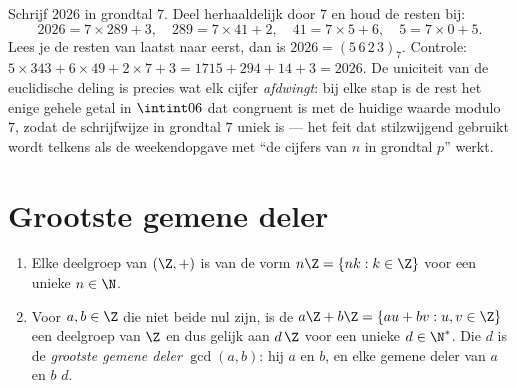 \begin{example}\label{ex:b1:arith:base7}
Schrijf $2026$ in grondtal $7$. Deel herhaaldelijk door $7$ en houd de
resten bij:
\[
2026 = 7 \times 289 + 3, \quad
289 = 7 \times 41 + 2, \quad
41 = 7 \times 5 + 6, \quad
5 = 7 \times 0 + 5 .
\]
Lees je de resten van laatst naar eerst, dan is $2026 = (5\,6\,2\,3)_7$.
Controle: $5 \times 343 + 6 \times 49 + 2 \times 7 + 3 = 1715 + 294 + 14
+ 3 = 2026$. De uniciteit van de euclidische deling is precies wat elk
cijfer \emph{afdwingt}: bij elke stap is de rest het enige gehele getal
in $\intint06$ dat congruent is met de huidige waarde modulo $7$, zodat
de schrijfwijze in grondtal $7$ uniek is --- het feit dat stilzwijgend
gebruikt wordt telkens als de weekendopgave met ``de cijfers van $n$ in
grondtal $p$'' werkt.
\end{example}

\section{Grootste gemene deler}

\begin{theorem}\label{thm:b1:arith:gcd}
\begin{enumerate}
  \item Elke deelgroep van $(\Z, +)$ is van de vorm $n\Z = \{nk : k \in
        \Z\}$ voor een unieke $n \in \N$.
  \item Voor $a, b \in \Z$ die niet beide nul zijn, is de 
        $a\Z + b\Z = \{au + bv : u, v \in \Z\}$ een deelgroep van $\Z$
        en dus gelijk aan $d\,\Z$ voor een unieke $d \in \N^*$. Die $d$
        is de \emph{grootste gemene deler}
        $\gcd(a, b)$: hij  $a$ en $b$, en elke gemene deler van $a$
        en $b$  $d$.
\end{enumerate}
\end{theorem}

